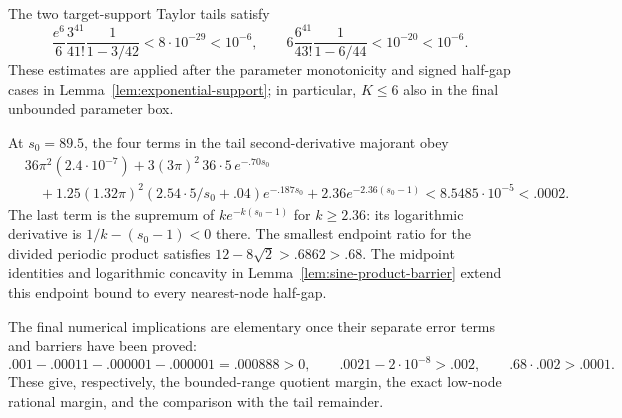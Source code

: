 The two target-support Taylor tails satisfy
\[
 \frac{e^6}{6}\frac{3^{41}}{41!}\frac1{1-3/42}
 <8\cdot10^{-29}<10^{-6},\qquad
 6\frac{6^{41}}{43!}\frac1{1-6/44}
 <10^{-20}<10^{-6}.
\]
These estimates are applied after the parameter monotonicity and signed
half-gap cases in Lemma~\ref{lem:exponential-support}; in particular,
$K\le6$ also in the final unbounded parameter box.

At $s_0=89.5$, the four terms in the tail second-derivative majorant obey
\begin{align*}
 &36\pi^2(2.4\cdot10^{-7})
 +3(3\pi)^2\,36\cdot5\,e^{-.70s_0}\\
 &\quad
 +1.25(1.32\pi)^2(2.54\cdot5/s_0+.04)e^{-.187s_0}
 +2.36e^{-2.36(s_0-1)}
 <8.5485\cdot10^{-5}<.0002.
\end{align*}
The last term is the supremum of $ke^{-k(s_0-1)}$ for $k\ge2.36$:
its logarithmic derivative is $1/k-(s_0-1)<0$ there.
The smallest endpoint ratio for the divided periodic product satisfies
$12-8\sqrt2>.6862>.68$.  The midpoint identities and logarithmic concavity in
Lemma~\ref{lem:sine-product-barrier} extend this endpoint bound to every
nearest-node half-gap.

The final numerical implications are elementary once their separate error
terms and barriers have been proved:
\[
 .001-.00011-.000001-.000001=.000888>0,\qquad
 .0021-2\cdot10^{-8}>.002,\qquad
 .68\cdot.002>.0001.
\]
These give, respectively, the bounded-range quotient margin, the exact
low-node rational margin, and the comparison with the tail remainder.

